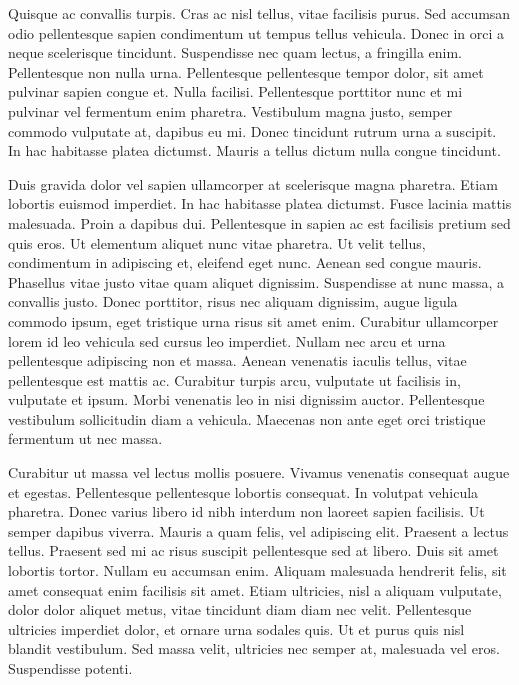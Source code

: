 Quisque ac convallis turpis.
Cras ac nisl tellus, vitae facilisis purus.
Sed accumsan odio pellentesque sapien condimentum ut tempus tellus vehicula.
Donec in orci a neque scelerisque tincidunt.
Suspendisse nec quam lectus, a fringilla enim.
Pellentesque non nulla urna.
Pellentesque pellentesque tempor dolor, sit amet pulvinar sapien congue et.
Nulla facilisi.
Pellentesque porttitor nunc et mi pulvinar vel fermentum enim pharetra.
Vestibulum magna justo, semper commodo vulputate at, dapibus eu mi.
Donec tincidunt rutrum urna a suscipit.
In hac habitasse platea dictumst.
Mauris a tellus dictum nulla congue tincidunt.

Duis gravida dolor vel sapien ullamcorper at scelerisque magna pharetra.
Etiam lobortis euismod imperdiet.
In hac habitasse platea dictumst.
Fusce lacinia mattis malesuada.
Proin a dapibus dui.
Pellentesque in sapien ac est facilisis pretium sed quis eros.
Ut elementum aliquet nunc vitae pharetra.
Ut velit tellus, condimentum in adipiscing et, eleifend eget nunc.
Aenean sed congue mauris.
Phasellus vitae justo vitae quam aliquet dignissim.
Suspendisse at nunc massa, a convallis justo.
Donec porttitor, risus nec aliquam dignissim, augue ligula commodo ipsum, eget tristique urna risus sit amet enim.
Curabitur ullamcorper lorem id leo vehicula sed cursus leo imperdiet.
Nullam nec arcu et urna pellentesque adipiscing non et massa.
Aenean venenatis iaculis tellus, vitae pellentesque est mattis ac.
Curabitur turpis arcu, vulputate ut facilisis in, vulputate et ipsum.
Morbi venenatis leo in nisi dignissim auctor.
Pellentesque vestibulum sollicitudin diam a vehicula.
Maecenas non ante eget orci tristique fermentum ut nec massa.

Curabitur ut massa vel lectus mollis posuere.
Vivamus venenatis consequat augue et egestas.
Pellentesque pellentesque lobortis consequat.
In volutpat vehicula pharetra.
Donec varius libero id nibh interdum non laoreet sapien facilisis.
Ut semper dapibus viverra.
Mauris a quam felis, vel adipiscing elit.
Praesent a lectus tellus.
Praesent sed mi ac risus suscipit pellentesque sed at libero.
Duis sit amet lobortis tortor.
Nullam eu accumsan enim.
Aliquam malesuada hendrerit felis, sit amet consequat enim facilisis sit amet.
Etiam ultricies, nisl a aliquam vulputate, dolor dolor aliquet metus, vitae tincidunt diam diam nec velit.
Pellentesque ultricies imperdiet dolor, et ornare urna sodales quis.
Ut et purus quis nisl blandit vestibulum.
Sed massa velit, ultricies nec semper at, malesuada vel eros.
Suspendisse potenti.

